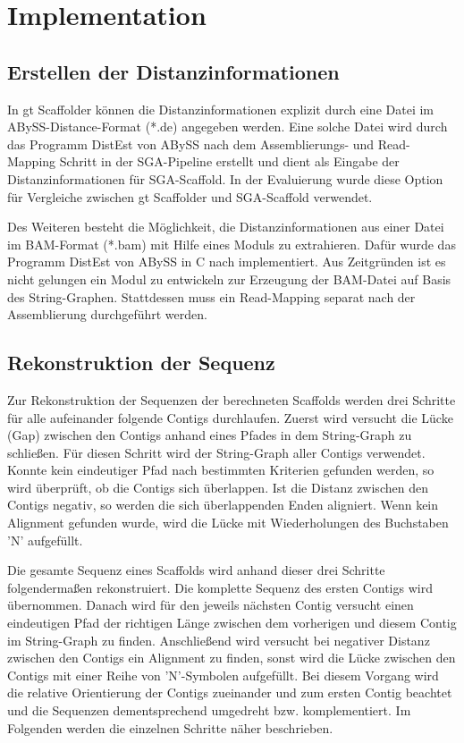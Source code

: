\documentclass[a4paper,10pt,parskip]{scrartcl}
\begin{document}
\section{Implementation}
\label{sec: Implementation}
\subsection{Erstellen der Distanzinformationen}
In gt Scaffolder können die Distanzinformationen explizit durch eine
Datei im ABySS-Distance-Format (*.de) angegeben werden. Eine solche
Datei wird durch das Programm DistEst von ABySS nach dem Assemblierungs-
und Read-Mapping Schritt in der SGA-Pipeline erstellt und dient als
Eingabe der Distanzinformationen für SGA-Scaffold. In der Evaluierung wurde diese Option für Vergleiche zwischen gt Scaffolder und SGA-Scaffold
verwendet.

Des Weiteren besteht die Möglichkeit, die Distanzinformationen aus
einer Datei im BAM-Format (*.bam) mit Hilfe eines Moduls zu
extrahieren. Dafür wurde das Programm DistEst von ABySS in C nach
implementiert. Aus Zeitgründen ist es nicht gelungen ein Modul zu
entwickeln zur Erzeugung der BAM-Datei auf Basis des String-Graphen. Stattdessen muss ein Read-Mapping separat nach der Assemblierung
durchgeführt werden.

\subsection{Rekonstruktion der Sequenz}
\label{sec: Rekonstruktion}
Zur Rekonstruktion der Sequenzen der berechneten Scaffolds werden drei
Schritte für alle aufeinander folgende Contigs durchlaufen. Zuerst
wird versucht die Lücke (Gap) zwischen den Contigs anhand eines Pfades
in dem String-Graph zu schließen. Für diesen Schritt wird der
String-Graph aller Contigs verwendet. Konnte kein eindeutiger Pfad nach
bestimmten Kriterien gefunden werden, so wird überprüft, ob die
Contigs sich überlappen. Ist die Distanz zwischen den Contigs negativ,
so werden die sich überlappenden Enden aligniert. Wenn kein Alignment
gefunden wurde, wird die Lücke mit Wiederholungen des Buchstaben 'N'
aufgefüllt.

Die gesamte Sequenz eines Scaffolds wird anhand dieser drei Schritte
folgendermaßen rekonstruiert. Die komplette Sequenz des ersten Contigs
wird übernommen. Danach wird für den jeweils nächsten Contig versucht
einen eindeutigen Pfad der richtigen Länge zwischen dem vorherigen und
diesem Contig im String-Graph zu finden. Anschließend wird versucht
bei negativer Distanz zwischen den Contigs ein Alignment zu finden,
sonst wird die Lücke zwischen den Contigs mit einer Reihe von
'N'-Symbolen aufgefüllt. Bei diesem Vorgang wird die relative
Orientierung der Contigs zueinander und zum ersten Contig beachtet und
die Sequenzen dementsprechend umgedreht 
bzw. komplementiert. Im Folgenden werden die einzelnen
Schritte näher beschrieben.
\end{document}

